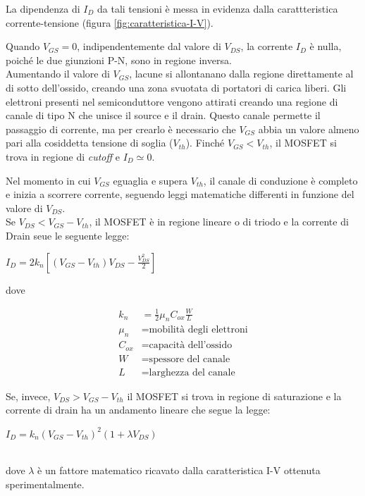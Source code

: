 La dipendenza di $I_D$ da tali tensioni è messa in evidenza dalla carattteristica corrente-tensione (figura \ref{fig:caratteristica-I-V}).

Quando $V_{GS} = 0$, indipendentemente dal valore di $V_{DS}$, la corrente $I_D$ è nulla, poiché le due giunzioni P-N, sono in regione inversa. \\
Aumentando il valore di $V_{GS}$, lacune si allontanano dalla regione direttamente al di sotto dell'ossido, creando una
zona svuotata di portatori di carica liberi. Gli elettroni presenti nel semiconduttore
vengono attirati creando una regione di canale di tipo N che unisce il
source e il drain. Questo canale permette il passaggio di corrente, ma per crearlo è necessario che $V_{GS}$ abbia un valore almeno pari alla cosiddetta tensione di soglia ($V_{th}$). Finché $V_{GS} < V_{th}$, il MOSFET si trova in regione di \emph{cutoff} e $I_D \simeq 0$.

Nel momento in cui $V_{GS}$ eguaglia e supera $V_{th}$, il canale di conduzione è completo e inizia a scorrere corrente, seguendo leggi matematiche differenti in funzione del valore di $V_{DS}$.\\

Se $V_{DS} < V_{GS} -  V_{th}$, il MOSFET è in regione lineare o di triodo e la corrente di Drain seue le seguente legge:\\
\centerline{ $I_D = 2k_n\left[ \left(V_{GS}-V_{th}\right)V_{DS} - \frac{V_{DS}^2}{2}\right]$}

dove

\begin{align*}
   k_n &= \frac{1}{2}\mu_n C_{ox}\frac{W}{L} \\
   \mu_n &= \text{mobilità degli elettroni} \\
   C_{ox} &= \text{capacità dell'ossido} \\
   W &= \text{spessore del canale} \\
   L &= \text{larghezza del canale}
\end{align*}








Se, invece, $V_{DS} > V_{GS} -  V_{th}$ il MOSFET si trova in regione di saturazione e la corrente di drain ha un andamento lineare che segue la legge:\\
\centerline{ $I_D = k_n\left(V_{GS}-V_{th}\right)^2 (1+\lambda V_{DS})$}\\
dove $\lambda$ è un fattore matematico ricavato dalla caratteristica I-V ottenuta sperimentalmente.\\

